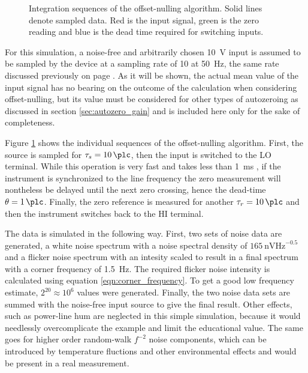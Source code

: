 \begin{figure}[ht]
    \centering
    \caption{Integration sequences of the offset-nulling algorithm. Solid lines denote sampled data. Red is the input signal, green is the zero reading and blue is the dead time required for switching inputs.}
    \label{fig:dmm_autozer_offset_nulling}
\end{figure}

For this simulation, a noise-free and arbitrarily chosen \qty{10}{\V} input is assumed to be sampled by the device at a sampling rate of \qty{10}{\plc} at \qty{50}{\Hz}, the same rate discussed previously on page \pageref{sec:dead_time}. As it will be shown, the actual mean value of the input signal has no bearing on the outcome of the calculation when considering offset-nulling, but its value must be considered for other types of autozeroing as discussed in section \ref{sec:autozero_gain} and is included here only for the sake of completeness.

Figure \ref{fig:dmm_autozer_offset_nulling} shows the individual sequences of the offset-nulling algorithm. First, the source is sampled for $\tau_s = \qty{10}{\plc}$, then the input is switched to the LO terminal. While this operation is very fast and takes less than \qty{1}{\ms} \cite{article_3458A_input_mpedance}, if the instrument is synchronized to the line frequency the zero measurement will nontheless be delayed until the next zero crossing, hence the dead-time $\theta = \qty{1}{\plc}$. Finally, the zero reference is measured for another $\tau_r = \qty{10}{\plc}$ and then the instrument switches back to the HI terminal.

The data is simulated in the following way. First, two sets of noise data are generated, a white noise spectrum with a noise spectral density of $\qty[power-half-as-sqrt, per-mode=symbol]{165}{\nV \Hz\tothe{-0.5}}$ and a flicker noise spectrum with an intesity scaled to result in a final spectrum with a corner frequency of \qty{1.5}{\Hz}. The required flicker noise intensity is calculated using equation \ref{eqn:corner_frequency}. To get a good low frequency estimate, $2^{20} \approx 10^{6}$ values were generated. Finally, the two noise data sets are summed with the noise-free input source to give the final result. Other effects, such as power-line hum are neglected in this simple simulation, because it would needlessly overcomplicate the example and limit the educational value. The same goes for higher order random-walk $f^{-2}$ noise components, which can be introduced by temperature fluctions and other environmental effects and would be present in a real measurement.

